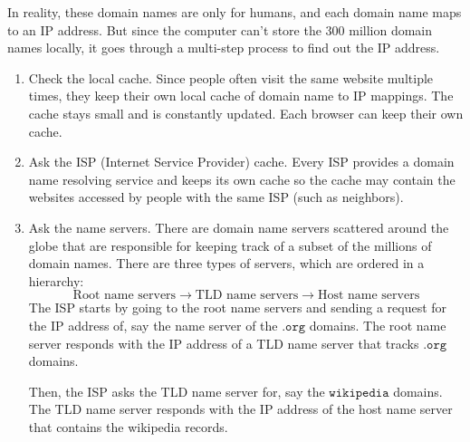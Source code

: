 \documentclass{article}
\begin{document}
  In reality, these domain names are only for humans, and each domain name maps to an IP address. But since the computer can't store the 300 million domain names locally, it goes through a multi-step process to find out the IP address. 

  \begin{enumerate}
      \item Check the local cache. Since people often visit the same website multiple times, they keep their own local cache of domain name to IP mappings. The cache stays small and is constantly updated. Each browser can keep their own cache. 
      \item Ask the ISP (Internet Service Provider) cache. Every ISP provides a domain name resolving service and keeps its own cache so the cache may contain the websites accessed by people with the same ISP (such as neighbors).  
      \item Ask the name servers. There are domain name servers scattered around the globe that are responsible for keeping track of a subset of the millions of domain names. There are three types of servers, which are ordered in a hierarchy: 
      \begin{equation}
        \text{Root name servers} \rightarrow \text{TLD name servers} \rightarrow \text{Host name servers}
      \end{equation}
      The ISP starts by going to the root name servers and sending a request for the IP address of, say the name server of the $\texttt{.org}$ domains. The root name server responds with the IP address of a TLD name server that tracks $\texttt{.org}$ domains. 
      \begin{center}
      \end{center}
      Then, the ISP asks the TLD name server for, say the $\texttt{wikipedia}$ domains. The TLD name server responds with the IP address of the host name server that contains the wikipedia records.
      \begin{center}
      \begin{tikzpicture}

\end{tikzpicture}
\end{center}
\end{enumerate}
\end{document}
